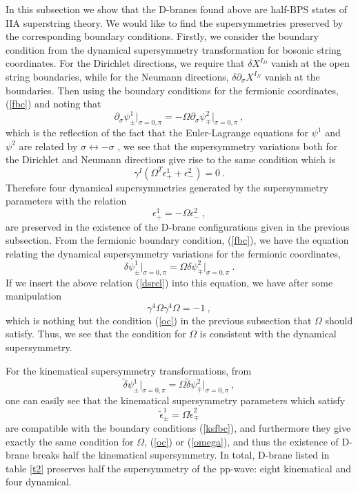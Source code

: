 \documentclass[a4paper,12pt]{article}
\begin{document}
In this subsection we show that the D-branes found above are half-BPS
states of IIA superstring theory.  We would like to find the
supersymmetries preserved by the corresponding boundary conditions.
Firstly, we consider the boundary condition from the dynamical
supersymmetry transformation for bosonic string coordinates. For the
Dirichlet directions, we require that $\delta X^{I_D}$ vanish at the
open string boundaries, while for the Neumann directions, $\delta
\partial_\sigma X^{I_N}$ vanish at the boundaries.  Then using the
boundary conditions for the fermionic coordinates, (\ref{fbc}) and
noting that
\[
\partial_\sigma \psi^1_\pm \bigg|_{\sigma = 0,\pi}
= - \Omega \partial_\sigma \psi^2_\mp \bigg|_{\sigma=0, \pi}~,
\]
which is the reflection of the fact that the Euler-Lagrange equations
for $\psi^1$ and $\psi^2$ are related by $\sigma \leftrightarrow -
\sigma$ \cite{lam031}, we see that the supersymmetry variations both
for the Dirichlet and Neumann directions give rise to the same
condition which is
\begin{equation}
\gamma^I ( \Omega^T \epsilon^1_+ + \epsilon^2_-) = 0 ~.
\end{equation}
Therefore four dynamical supersymmetries generated by the
supersymmetry parameters with the relation
\begin{equation}
\epsilon^1_+ = - \Omega \epsilon^2_-~,
\label{dsrel}
\end{equation}
are preserved in the existence of the D-brane configurations given in
the previous subsection.  From the fermionic boundary condition,
(\ref{fbc}), we have the equation relating the dynamical supersymmetry
variations for the fermionic coordinates,
\begin{equation}
\delta \psi^1_\pm \bigg|_{\sigma = 0, \pi}
 = \Omega \delta \psi^2_\mp \bigg|_{\sigma=0, \pi} ~.
\end{equation}
If we insert the above relation (\ref{dsrel}) into this equation, we
have after some manipulation
\begin{equation}
\gamma^4 \Omega \gamma^4 \Omega = -1 ~,
\label{omega}
\end{equation}
which is nothing but the condition (\ref{oc}) in the previous
subsection that $\Omega$ should satisfy.  Thus, we see that the
condition for $\Omega$ is consistent with the dynamical supersymmetry.
 
For the kinematical supersymmetry transformations, from 
\begin{equation}
\tilde{\delta} \psi^1_\pm \bigg|_{\sigma =0, \pi}
= \Omega \tilde{\delta} \psi^2_\mp \bigg|_{\sigma=0,\pi} ~,
\label{ksfbc}
\end{equation}
one can easily see that the kinematical supersymmetry parameters
which satisfy 
\begin{equation}
\tilde{\epsilon}^1_\pm = \Omega \tilde{\epsilon}^2_\mp
\end{equation}
are compatible with the boundary conditions (\ref{ksfbc}), and
furthermore they give exactly the same condition for $\Omega$,
(\ref{oc}) or (\ref{omega}), and thus the existence of D-brane breaks
half the kinematical supersymmetry.  In total, D-brane listed in table
\ref{t2} preserves half the supersymmetry of the pp-wave: eight
kinematical and four dynamical.
\end{document}
